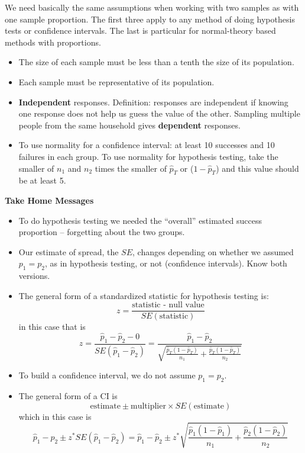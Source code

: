   We need basically the same assumptions when working with two samples
  as with one sample proportion.  The first three apply to any method
  of doing hypothesis tests or confidence intervals.  The last is
  particular for normal-theory based methods with proportions. 
  \begin{itemize}
     \item The size of each sample must be less than a tenth the size
       of its population.
     \item Each sample must be representative of its population. 
     \item {\bf Independent} responses.  Definition: responses are
       independent if knowing one response does not help us guess the
       value of the other.  Sampling multiple people from the same
       household gives {\bf dependent} responses.
     \item To use normality for a confidence interval: at least 10
       successes and 10 failures in each group.  To use normality for
       hypothesis testing, take the smaller of $n_1$ and $n_2$ times
       the smaller of $\widehat{p}_T$ or ($1-\widehat{p}_T$) and this
       value should be at least 5.\vspace{1in}
  \end{itemize}



\begin{center}
  {\large\bf Take Home Messages}
\end{center}

\begin{itemize}
 \item  To do hypothesis testing we needed the ``overall'' estimated
   success proportion -- forgetting about the two groups. 
 \item Our estimate of spread, the $SE$, changes depending on whether
   we assumed $p_1=p_2$, as in hypothesis testing, or not (confidence
   intervals). Know both versions.
 \item  The general form of a standardized statistic for hypothesis
   testing is:
     $$z = \frac{\mbox{statistic - null value}}{SE(\mbox{statistic})}$$
in this case that is
$$ z = \frac{\widehat{p}_1 - \widehat{p}_2 -0}{ SE(\widehat{p}_1 -
  \widehat{p}_2)} = \frac{\widehat{p}_1 - \widehat{p}_2} 
   {\sqrt{\frac{\widehat{p}_T(1-\widehat{p}_T)}{n_1} +
    \frac{\widehat{p}_T(1-\widehat{p}_T)}{n_2}}}$$
\item To build a confidence interval, we do not assume ${p}_1 ={p}_2$.
\item The general form of a CI is
$$ \mbox{estimate} \pm \mbox{multiplier} \times SE(\mbox{estimate})$$
    which in this case is
  $$ \widehat{p}_1 - \widehat{p}_2 \pm z^* SE(\widehat{p}_1 -
  \widehat{p}_2) = \widehat{p}_1 - \widehat{p}_2 \pm z^* 
\sqrt{\frac{\widehat{p}_1(1 - \widehat{p}_1)}{n_1} + 
      \frac{\widehat{p}_2(1 - \widehat{p}_2)}{n_2}}$$
\end{itemize}



